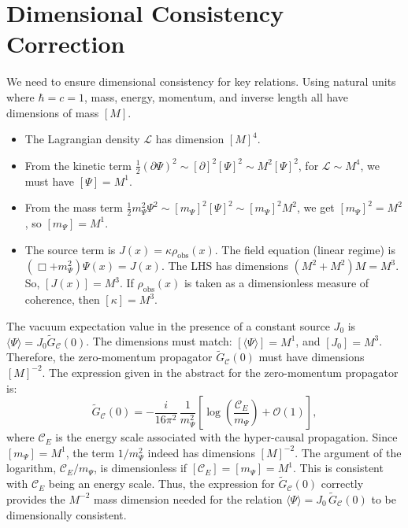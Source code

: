 \documentclass[11pt,a4paper]{article}
\newcommand{\PsiField}{\ensuremath{\Psi}}
\newcommand{\PropSpeed}{\ensuremath{\mathscr{C}}}
\newcommand{\Lagr}{\ensuremath{\mathcal{L}}}
\newcommand{\Ord}{\ensuremath{\mathcal{O}}}
\newcommand{\expval}[1]{\ensuremath{\langle#1\rangle}}
\begin{document}
\section{Dimensional Consistency Correction}
\label{sec:dimensional-consistency}
We need to ensure dimensional consistency for key relations. Using natural units where $\hbar=c=1$, mass, energy, momentum, and inverse length all have dimensions of mass $[M]$.
\begin{itemize}
    \item The Lagrangian density $\Lagr$ has dimension $[M]^4$.
    \item From the kinetic term $\frac{1}{2}(\partial\PsiField)^2 \sim [\partial]^2[\PsiField]^2 \sim M^2[\PsiField]^2$, for $\Lagr \sim M^4$, we must have $[\PsiField] = M^1$.
    \item From the mass term $\frac{1}{2}m_\PsiField^2\PsiField^2 \sim [m_\PsiField]^2[\PsiField]^2 \sim [m_\PsiField]^2 M^2$, we get $[m_\PsiField]^2 = M^2$, so $[m_\PsiField] = M^1$.
    \item The source term is $J(x) = \kappa \rho_{\text{obs}}(x)$. The field equation (linear regime) is $(\Box + m_\PsiField^2)\PsiField(x) = J(x)$.
    The LHS has dimensions $(M^2+M^2)M = M^3$. So, $[J(x)] = M^3$.
    If $\rho_{\text{obs}}(x)$ is taken as a dimensionless measure of coherence, then $[\kappa] = M^3$.
\end{itemize}
The vacuum expectation value in the presence of a constant source $J_0$ is $\expval{\PsiField} = J_0 \tilde{G}_{\PropSpeed}(0)$.
The dimensions must match: $[\expval{\PsiField}] = M^1$, and $[J_0] = M^3$.
Therefore, the zero-momentum propagator $\tilde{G}_{\PropSpeed}(0)$ must have dimensions $[M]^{-2}$.
The expression given in the abstract for the zero-momentum propagator is:
\begin{equation}
    \tilde{G}_{\PropSpeed}(0) = -\frac{i}{16\pi^{2}}\, \frac{1}{m_\PsiField^{2}} \left[\log\left(\frac{\PropSpeed_{E}}{m_\PsiField}\right) + \Ord(1)\right],
\end{equation}
where $\PropSpeed_{E}$ is the energy scale associated with the hyper-causal propagation.
Since $[m_\PsiField] = M^1$, the term $1/m_\PsiField^2$ indeed has dimensions $[M]^{-2}$. The argument of the logarithm, $\PropSpeed_{E}/m_\PsiField$, is dimensionless if $[\PropSpeed_{E}] = [m_\PsiField] = M^1$. This is consistent with $\PropSpeed_{E}$ being an energy scale.
Thus, the expression for $\tilde{G}_{\PropSpeed}(0)$ correctly provides the $M^{-2}$ mass dimension needed for the relation $\expval{\PsiField}=J_{0}\,\tilde{G}_{\PropSpeed}(0)$ to be dimensionally consistent.
\end{document}
